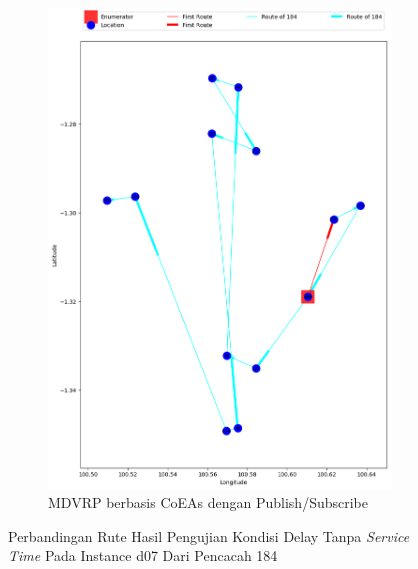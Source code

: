 \begin{figure}[H]\ContinuedFloat
	\centering
	\begin{subfigure}[t]{\textwidth}
		\centering
		\includegraphics[width=\textwidth]{Resources/Images/delayed_7/real_m15_n100_delayed_7_184_pubsub_coes}
		\caption{MDVRP berbasis CoEAs dengan Publish/Subscribe}
		\label{fig:real_m15_n100_delayed_7_184_pubsub_coes}
	\end{subfigure}
	\caption{Perbandingan Rute Hasil Pengujian Kondisi Delay Tanpa \textit{Service Time} Pada Instance d07 Dari Pencacah 184}
	\label{fig:real_m15_n100_delayed_7_184_contd}
\end{figure}


